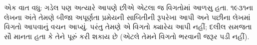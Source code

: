 \documentclass[../../../include/open-logic-section]{subfiles}
\begin{document}
\begin{digress}
એક વાત વધુ: ગડેલ પણ
અત્યારે આપણે છીએ એટલા
જ વિગતોમાં આળસુ હતા.
૧૯૩૧ના લેખના અંતે તેમણે
બીજા અપૂર્ણતા પ્રમેયની
સાબિતીની રૂપરેખા આપી
અને પછીના લેખમાં વિગતો
આપવાનું વચન આપ્યું.
પરંતુ તેમણે એ વિગતો
ક્યારેય આપી નહીં;
દલીલ સમજતા સૌ માનતા
હતા કે તેને પૂરું કરી
શકાય છે (એટલે તેમને
વિગતો ભરવાની જરૂર
પડી નહીં).
\end{digress}
\end{document}
